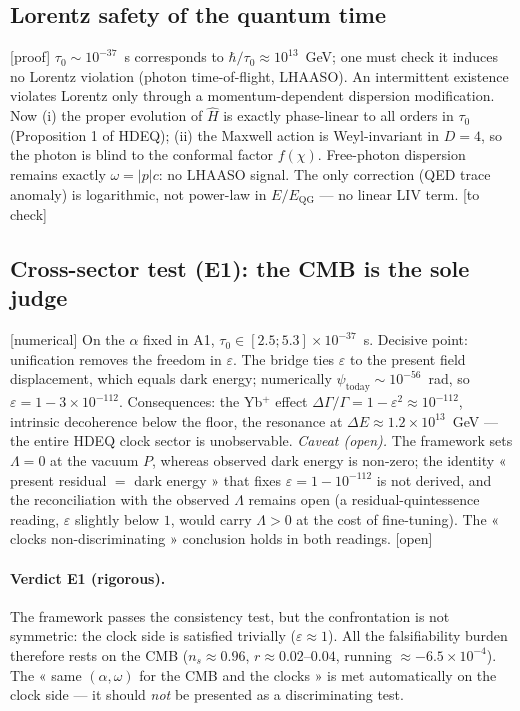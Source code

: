 \documentclass[11pt,a4paper]{article}
\newcommand{\statut}[1]{{\footnotesize\textsf{[#1]}}}
\theoremstyle{definition}
\begin{document}
\subsection{Lorentz safety of the quantum time}
\statut{proof} $\tau_0\sim10^{-37}$~s corresponds to $\hbar/\tau_0\approx10^{13}$~GeV; one must
check it induces no Lorentz violation (photon time-of-flight, LHAASO). An intermittent
existence violates Lorentz only through a momentum-dependent dispersion modification. Now (i)
the proper evolution of $\hat H$ is exactly phase-linear to all orders in $\tau_0$
(Proposition 1 of HDEQ); (ii) the Maxwell action is Weyl-invariant in $D=4$, so the photon is
blind to the conformal factor $f(\chi)$. Free-photon dispersion remains exactly
$\omega=|p|c$: no LHAASO signal. The only correction (QED trace anomaly) is logarithmic, not
power-law in $E/E_{\mathrm{QG}}$ --- no linear LIV term. \statut{to check}

\subsection{Cross-sector test (E1): the CMB is the sole judge}
\statut{numerical} On the $\alpha$ fixed in A1, $\tau_0\in[2.5;5.3]\times10^{-37}$~s. Decisive
point: unification removes the freedom in $\varepsilon$. The bridge ties $\varepsilon$ to the
present field displacement, which equals dark energy; numerically $\psi_{\mathrm{today}}\sim10^{-56}$~rad,
so $\varepsilon=1-3\times10^{-112}$. Consequences: the Yb$^+$ effect
$\Delta\Gamma/\Gamma=1-\varepsilon^2\approx10^{-112}$, intrinsic decoherence below the floor,
the resonance at $\Delta E\approx1.2\times10^{13}$~GeV --- the entire HDEQ clock sector is
unobservable. \emph{Caveat (open).} The framework sets $\Lambda=0$ at the vacuum $P$, whereas
observed dark energy is non-zero; the identity « present residual $=$ dark energy » that fixes
$\varepsilon=1-10^{-112}$ is not derived, and the reconciliation with the observed $\Lambda$
remains open (a residual-quintessence reading, $\varepsilon$ slightly below $1$, would carry
$\Lambda>0$ at the cost of fine-tuning). The « clocks non-discriminating » conclusion holds in
both readings. \statut{open}

\paragraph{Verdict E1 (rigorous).} The framework passes the consistency test, but the
confrontation is not symmetric: the clock side is satisfied trivially ($\varepsilon\approx1$).
All the falsifiability burden therefore rests on the CMB ($n_s\approx0.96$,
$r\approx0.02$--$0.04$, running $\approx-6.5\times10^{-4}$). The « same $(\alpha,\omega)$ for
the CMB and the clocks » is met automatically on the clock side --- it should \emph{not} be
presented as a discriminating test.
\end{document}
